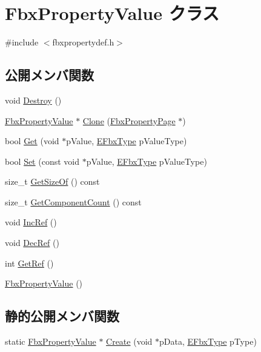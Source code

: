 \hypertarget{class_fbx_property_value}{}\section{Fbx\+Property\+Value クラス}
\label{class_fbx_property_value}


{\ttfamily \#include $<$fbxpropertydef.\+h$>$}

\subsection*{公開メンバ関数}
\begin{DoxyCompactItemize}
\item 
void \hyperlink{class_fbx_property_value_a017c539a6257ab1f1345e307861788a3}{Destroy} ()
\item 
\hyperlink{class_fbx_property_value}{Fbx\+Property\+Value} $\ast$ \hyperlink{class_fbx_property_value_a75133be7d5fcb9013955a940726d17da}{Clone} (\hyperlink{class_fbx_property_page}{Fbx\+Property\+Page} $\ast$)
\item 
bool \hyperlink{class_fbx_property_value_a3951cea8dd99842374a73df752825d76}{Get} (void $\ast$p\+Value, \hyperlink{fbxpropertytypes_8h_a73913a5ddfb20e57c6f25e9e6784bd92}{E\+Fbx\+Type} p\+Value\+Type)
\item 
bool \hyperlink{class_fbx_property_value_a619bc0993f915fced412d4c78c739769}{Set} (const void $\ast$p\+Value, \hyperlink{fbxpropertytypes_8h_a73913a5ddfb20e57c6f25e9e6784bd92}{E\+Fbx\+Type} p\+Value\+Type)
\item 
size\+\_\+t \hyperlink{class_fbx_property_value_acdfbe806104be54674133d40bf604df5}{Get\+Size\+Of} () const
\item 
size\+\_\+t \hyperlink{class_fbx_property_value_a423acf113aea566bf1ef2e753644e1f2}{Get\+Component\+Count} () const
\item 
void \hyperlink{class_fbx_property_value_a2941cded4b8794c26d25019c08710cee}{Inc\+Ref} ()
\item 
void \hyperlink{class_fbx_property_value_aacad1c8e1f83bf48b784ea1873442156}{Dec\+Ref} ()
\item 
int \hyperlink{class_fbx_property_value_a246b30c1a051700fcdb6f20c07684f13}{Get\+Ref} ()
\item 
\hyperlink{class_fbx_property_value_a934248805a8fe3c9ea98f9480780a82d}{Fbx\+Property\+Value} ()
\end{DoxyCompactItemize}
\subsection*{静的公開メンバ関数}
\begin{DoxyCompactItemize}
\item 
static \hyperlink{class_fbx_property_value}{Fbx\+Property\+Value} $\ast$ \hyperlink{class_fbx_property_value_a7640a14cf283be32d88fbef8ecf1a252}{Create} (void $\ast$p\+Data, \hyperlink{fbxpropertytypes_8h_a73913a5ddfb20e57c6f25e9e6784bd92}{E\+Fbx\+Type} p\+Type)
\end{DoxyCompactItemize}



